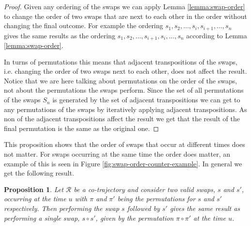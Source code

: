 \documentclass[12pt]{article}
\newcommand{\cotraj}{\mathcal{R}}
\newcommand{\swap}{s}
\newcommand{\swaptime}{u}
\newtheorem{proposition}{Proposition}
\theoremstyle{definition}
\begin{document}
\begin{proof}
  Given any ordering of the swaps we can apply Lemma
  \ref{lemma:swap-order} to change the order of two swaps that are
  next to each other in the order without changing the final outcome.
  For example the ordering
  \(s_{1}, s_{2}, \dots, s_{i}, s_{i + 1}, \dots, s_{n}\) gives the
  same results as the ordering
  \(s_{1}, s_{2}, \dots, s_{i + 1}, s_{i}, \dots, s_{n}\) according to
  Lemma \ref{lemma:swap-order}.

  In turns of permutations this means that adjacent transpositions of
  the swaps, i.e. changing the order of two swaps next to each other,
  does not affect the result. Notice that we are here talking about
  permutations on the order of the swaps, not about the permutations
  the swaps perform. Since the set of all permutations of the swaps
  \(S_{n}\) is generated by the set of adjacent transpositions we can
  get to any permutations of the swaps by iteratively applying
  adjacent transpositions. As non of the adjacent transpositions
  affect the result we get that the result of the final permutation is
  the same as the original one.
\end{proof}

This proposition shows that the order of swaps that occur at different
times does not matter. For swaps occurring at the same time the order
does matter, an example of this is seen in Figure
\ref{fig:swap-order-counter-example}. In general we get the following
result.

\begin{proposition}
  Let \(\cotraj\) be a co-trajectory and consider two valid swaps,
  \(\swap\) and \(\swap'\), occurring at the time \(\swaptime\) with
  \(\pi\) and \(\pi'\) being the permutations for \(\swap\) and
  \(\swap'\) respectively. Then performing the swap \(\swap\) followed
  by \(\swap'\) gives the same result as performing a single swap,
  \(\swap \circ \swap'\), given by the permutation \(\pi \circ \pi'\)
  at the time \(\swaptime\).
\end{proposition}
\end{document}
